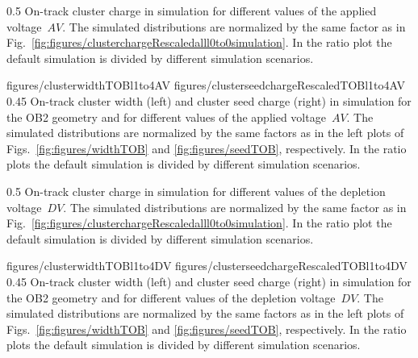 
                 {0.5}       %
                 { On-track cluster charge in simulation for different values of the applied voltage~$AV$.  The simulated distributions are normalized by the same factor as in Fig.~\ref{fig:figures/clusterchargeRescaledalll0to0simulation}. In the ratio plot the default simulation is divided by different simulation scenarios. }

                 {figures/clusterwidthTOBl1to4AV}
                 {figures/clusterseedchargeRescaledTOBl1to4AV} %
                 {0.45}       %
                 {  On-track cluster width (left) and cluster seed charge (right) in simulation  for the OB2 geometry and for different values of the applied voltage~$AV$. The simulated distributions are normalized by the same factors as in the left plots of Figs.~\ref{fig:figures/widthTOB} and \ref{fig:figures/seedTOB}, respectively.   In the ratio plots the default simulation is divided by different simulation scenarios. }


                 {0.5}       %
                 {  On-track cluster charge in simulation for different values of the depletion voltage~$DV$.   The simulated distributions are normalized by the same factor as in Fig.~\ref{fig:figures/clusterchargeRescaledalll0to0simulation}.  In the ratio plot the default simulation is divided by different simulation scenarios. }

                 {figures/clusterwidthTOBl1to4DV}
                 {figures/clusterseedchargeRescaledTOBl1to4DV} %
                 {0.45}       %
                 {  On-track cluster width (left) and cluster seed charge (right) in simulation  for the OB2 geometry and for different values of the depletion voltage~$DV$.  The simulated distributions are normalized by the same factors as in the left plots of Figs.~\ref{fig:figures/widthTOB} and \ref{fig:figures/seedTOB}, respectively.   In the ratio plots the default simulation is divided by different simulation scenarios. }


